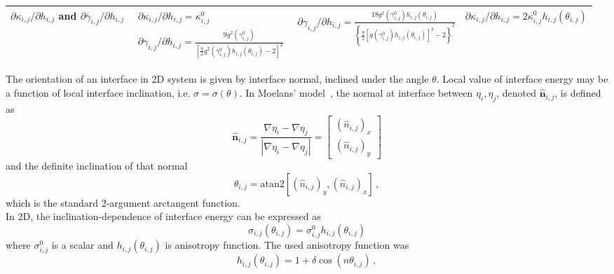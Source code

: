 \begin{sidewaystable}[]
\begin{tabular}{p{2cm}|>{\centering\arraybackslash}p{5cm}>{\centering\arraybackslash}p{5cm}>{\centering\arraybackslash}p{4.2cm}}
		$\partial \kappa_{i,j}/\partial h_{i,j}$ and $\partial \gamma_{i,j}/\partial h_{i
			,j}$ 
		& $\begin{array}{l}
			\partial \kappa_{i,j}/\partial h_{i,j} = \kappa_{i,j}^0 \\
			\partial \gamma_{i,j}/\partial h_{i,j} = \frac{9g^2( \gamma_{i,j}^0)}{\left[\frac{9}{2}g^2(\gamma_{i,j}^0)h_{i,j}(\theta_{i,j}) - 2\right]^2}
		\end{array}$ 
		& $\partial \gamma_{i,j}/\partial h_{i,j} = \frac{18g^2(\gamma_{i,j}^0)h_{i,j}(\theta_{i,j})}{\left\{\frac{9}{2}[g(\gamma_{i,j}^0)h_{i,j}(\theta_{i,j})]^2 - 2\right\}^2}$ 
		& $\partial \kappa_{i,j}/\partial h_{i,j} = 2 \kappa_{i,j}^0h_{i,j}(\theta_{i,j})$\\
		\bottomrule
	\end{tabular}
\end{sidewaystable}
The orientation of an interface in 2D system is given by interface normal, inclined under the angle $\theta$. Local value of interface energy may be a function of local interface inclination, i.e. $\sigma = \sigma(\theta)$. In Moelans' model~\cite{Moelans2008}, the normal at interface between $\eta_i,\eta_j$, denoted $\hat{\bm{n}}_{i,j}$, is defined as 
\begin{equation} \label{eq_def_inclination}
	\hat{\bm{n}}_{i,j} = \frac{\nabla\eta_i-\nabla\eta_j}{|\nabla\eta_i-\nabla\eta_j|} = \left[\begin{array}{c}
		(\hat{n}_{i,j})_x   \\
		(\hat{n}_{i,j})_y
	\end{array} \right]
\end{equation}
and the definite inclination of that normal 
\begin{equation}
	\theta_{i,j} = \mathrm{atan2}[(\hat{n}_{i,j})_y,(\hat{n}_{i,j})_x] \,,
\end{equation}
which is the standard 2-argument arctangent function.\\
In 2D, the inclination-dependence of interface energy can be expressed as 
\begin{equation}\label{eq_IE_incldep}
	\sigma_{i,j}(\theta_{i,j}) = \sigma_{i,j}^0h_{i,j}(\theta_{i,j})
\end{equation}
where $\sigma_{i,j}^0$ is a scalar and  $h_{i,j}(\theta_{i,j})$ is anisotropy function. The used anisotropy function was
\begin{equation}
	h_{i,j}(\theta_{i,j}) = 1 + \delta\cos(n\theta_{i,j}) \,,
\end{equation}

